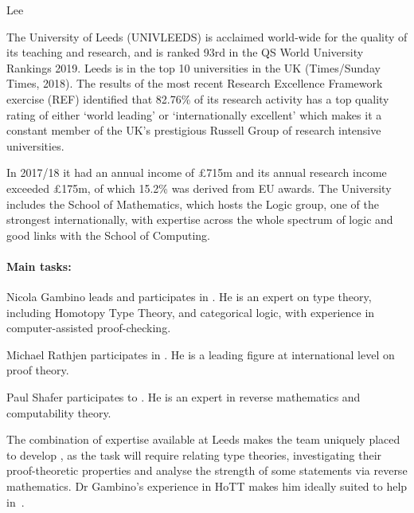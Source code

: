 \begin{sitedescription}{Lee}


The University of Leeds (UNIVLEEDS) is acclaimed world-wide for the quality of its teaching and research, and is ranked 93rd in the QS World University Rankings 2019. Leeds is in the top 10 universities in the UK (Times/Sunday Times, 2018). The results of the most recent Research Excellence Framework exercise (REF) identified that 82.76\% 
of its research activity has a top quality rating of either `world leading' or `internationally excellent' which makes it a constant member of the UK's prestigious Russell Group of research intensive universities. 

In 2017/18 it had an annual income of \pounds 715m and its annual research income exceeded \pounds 175m, of which 15.2\% was derived from EU awards. The University includes the School of Mathematics,
which hosts the Logic group, one of the strongest internationally, with expertise across the whole
spectrum of logic and good links with the School of Computing.




\paragraph*{Main tasks:}

\begin{compactitem}
\item Nicola Gambino leads   and participates in . He is an expert on type theory,
including Homotopy Type Theory, and categorical logic, with experience in computer-assisted proof-checking. 
\item Michael Rathjen participates in . He is a leading figure at international level
on proof theory. 
\item Paul Shafer participates to  . He is an expert in reverse mathematics
and computability theory.
\end{compactitem}
The combination of expertise available at Leeds makes the team uniquely placed to develop  ,
as the task will require relating type theories, investigating their proof-theoretic properties and analyse the strength of some
statements via reverse mathematics. Dr Gambino's experience in HoTT makes him ideally suited to help in~.



\end{sitedescription}
